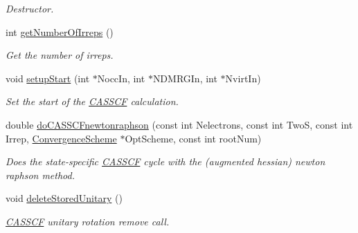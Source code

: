 \begin{DoxyCompactItemize}
\begin{DoxyCompactList}\small\item\em Destructor. \end{DoxyCompactList}\item 
int \hyperlink{classCheMPS2_1_1CASSCF_afba8add72828a26c426f47a790511bf1}{get\-Number\-Of\-Irreps} ()
\begin{DoxyCompactList}\small\item\em Get the number of irreps. \end{DoxyCompactList}\item 
void \hyperlink{classCheMPS2_1_1CASSCF_a701bdaa40881168d6b386683eaa01cea}{setup\-Start} (int $\ast$Nocc\-In, int $\ast$N\-D\-M\-R\-G\-In, int $\ast$Nvirt\-In)
\begin{DoxyCompactList}\small\item\em Set the start of the \hyperlink{classCheMPS2_1_1CASSCF}{C\-A\-S\-S\-C\-F} calculation. \end{DoxyCompactList}\item 
double \hyperlink{classCheMPS2_1_1CASSCF_aee8753e7169f61e4804ddbc1b7e8409d}{do\-C\-A\-S\-S\-C\-Fnewtonraphson} (const int Nelectrons, const int Two\-S, const int Irrep, \hyperlink{classCheMPS2_1_1ConvergenceScheme}{Convergence\-Scheme} $\ast$Opt\-Scheme, const int root\-Num)
\begin{DoxyCompactList}\small\item\em Does the state-\/specific \hyperlink{classCheMPS2_1_1CASSCF}{C\-A\-S\-S\-C\-F} cycle with the (augmented hessian) newton raphson method. \end{DoxyCompactList}\item 
\hypertarget{classCheMPS2_1_1CASSCF_aafa1ad3896c1625be172f326113f9a30}{void \hyperlink{classCheMPS2_1_1CASSCF_aafa1ad3896c1625be172f326113f9a30}{delete\-Stored\-Unitary} ()}\label{classCheMPS2_1_1CASSCF_aafa1ad3896c1625be172f326113f9a30}

\begin{DoxyCompactList}\small\item\em \hyperlink{classCheMPS2_1_1CASSCF}{C\-A\-S\-S\-C\-F} unitary rotation remove call. \end{DoxyCompactList}\end{DoxyCompactItemize}


